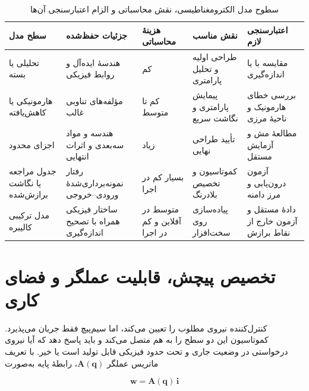 \begin{table}[htbp]
	\centering
	\caption{سطوح مدل الکترومغناطیسی، نقش محاسباتی و الزام اعتبارسنجی آن‌ها}
	\label{tab:model-fidelity-roles}
	\renewcommand{\arraystretch}{1.25}
	\setlength{\tabcolsep}{3pt}
	\scriptsize
	\begin{tabular}{|p{}|p{}|p{}|p{}|p{}|}
		\hline
		\textbf{سطح مدل} & \textbf{جزئیات حفظ‌شده} & \textbf{هزینهٔ محاسباتی} & \textbf{نقش مناسب} & \textbf{اعتبارسنجی لازم} \\
		\hline
		تحلیلی یا بسته & هندسهٔ ایده‌آل و روابط فیزیکی & کم & طراحی اولیه و تحلیل پارامتری & مقایسه با \lr{FEM} یا اندازه‌گیری \cite{akoun3DAnalyticalCalculation1984} \\
		\hline
		هارمونیکی یا کاهش‌یافته & مؤلفه‌های تناوبی غالب & کم تا متوسط & پیمایش پارامتری و نگاشت سریع & بررسی خطای هارمونیک و ناحیهٔ مرزی \cite{wangMagnetArrayPlanar2020} \\
		\hline
		اجزای محدود & هندسه و مواد سه‌بعدی و اثرات انتهایی & زیاد & تأیید طراحی نهایی & مطالعهٔ مش و آزمایش مستقل \cite{liFiniteElementModeling2025} \\
		\hline
		جدول مراجعه یا نگاشت برازش‌شده & رفتار نمونه‌برداری‌شدهٔ ورودی--خروجی & بسیار کم در اجرا & کموتاسیون و تخصیص بلادرنگ & آزمون درون‌یابی و مرز دامنه \cite{jeroendeboeijLookUpTableBased2007} \\
		\hline
		مدل ترکیبی کالیبره & ساختار فیزیکی همراه با تصحیح اندازه‌گیری & متوسط در آفلاین و کم در اجرا & پیاده‌سازی روی سخت‌افزار & دادهٔ مستقل و آزمون خارج از نقاط برازش \cite{nakataCompensationFEMBased2026} \\
		\hline
	\end{tabular}
\end{table}


\section{تخصیص پیچش، قابلیت عملگر و فضای کاری}
\label{sec:commutation_wrench_allocation}

کنترل‌کننده نیروی مطلوب را تعیین می‌کند، اما سیم‌پیچ فقط جریان می‌پذیرد. کموتاسیون این دو سطح را به هم متصل می‌کند و باید پاسخ دهد که آیا نیروی درخواستی در وضعیت جاری و تحت حدود فیزیکی قابل تولید است یا خیر. با تعریف ماتریس عملگر $\mathbf{A}(\mathbf{q})$، رابطهٔ پایه به‌صورت

\begin{equation}
	\mathbf{w}
	=
	\mathbf{A}(\mathbf{q})\,\mathbf{i}
	\label{eq:commutation_wrench_current_mapping}
\end{equation}

